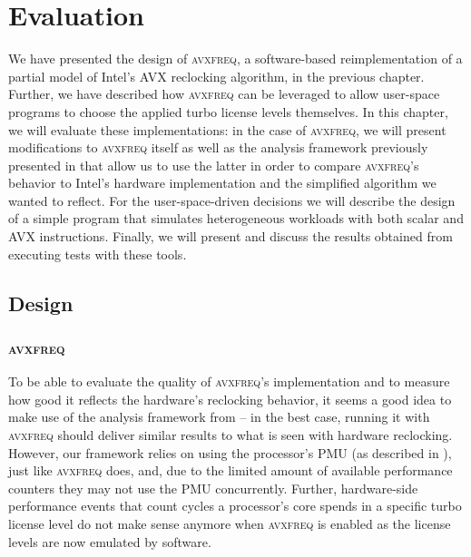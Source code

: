 \chapter{Evaluation}
\label{sec:evaluation}

We have presented the design of \textsc{avxfreq}, a software-based reimplementation of a partial model of Intel's \gls{AVX} reclocking algorithm, in the previous chapter. Further, we have described how \textsc{avxfreq} can be leveraged to allow user-space programs to choose the applied turbo license levels themselves. In this chapter, we will evaluate these implementations: in the case of \textsc{avxfreq}, we will present modifications to \textsc{avxfreq} itself as well as the analysis framework previously presented in  that allow us to use the latter in order to compare \textsc{avxfreq}'s behavior to Intel's hardware implementation and the simplified algorithm we wanted to reflect. For the user-space-driven decisions we will describe the design of a simple program that simulates heterogeneous workloads with both scalar and \gls{AVX} instructions. Finally, we will present and discuss the results obtained from executing tests with these tools.

\section{Design}
\label{sec:evaluation:design}



\subsection{\textsc{avxfreq}}
\label{sec:evaluation:design:avxfreq}

To be able to evaluate the quality of \textsc{avxfreq}'s implementation and to measure how good it reflects the hardware's reclocking behavior, it seems a good idea to make use of the analysis framework from  -- in the best case, running it with \textsc{avxfreq} should deliver similar results to what is seen with hardware reclocking. However, our framework relies on using the processor's \gls{PMU} (as described in ), just like \textsc{avxfreq} does, and, due to the limited amount of available performance counters they may not use the \gls{PMU} concurrently. Further, hardware-side performance events that count cycles a processor's core spends in a specific turbo license level do not make sense anymore when \textsc{avxfreq} is enabled as the license levels are now emulated by software.

